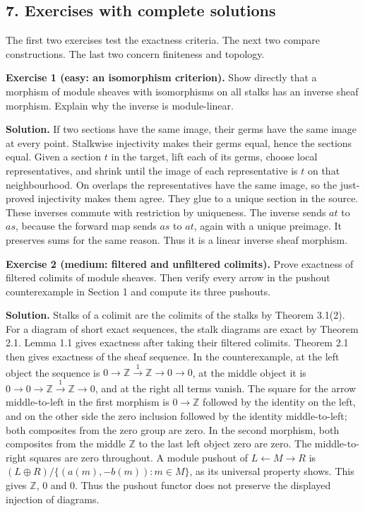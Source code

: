 \documentclass[
  english,
  11pt,
  a4paper,
]{article}
\begin{document}
\subsection{7. Exercises with complete
solutions}\label{sheaves-of-modules-on-a-ringed-space--7-exercises-with-complete-solutions}

The first two exercises test the exactness criteria. The next two
compare constructions. The last two concern finiteness and topology.

\textbf{Exercise 1 (easy: an isomorphism criterion).} Show directly that
a morphism of module sheaves with isomorphisms on all stalks has an
inverse sheaf morphism. Explain why the inverse is module-linear.

\textbf{Solution.} If two sections have the same image, their germs have
the same image at every point. Stalkwise injectivity makes their germs
equal, hence the sections equal. Given a section \(t\) in the target,
lift each of its germs, choose local representatives, and shrink until
the image of each representative is \(t\) on that neighbourhood. On
overlaps the representatives have the same image, so the just-proved
injectivity makes them agree. They glue to a unique section in the
source. These inverses commute with restriction by uniqueness. The
inverse sends \(a t\) to \(a s\), because the forward map sends \(a s\)
to \(a t\), again with a unique preimage. It preserves sums for the same
reason. Thus it is a linear inverse sheaf morphism.

\textbf{Exercise 2 (medium: filtered and unfiltered colimits).} Prove
exactness of filtered colimits of module sheaves. Then verify every
arrow in the pushout counterexample in Section 1 and compute its three
pushouts.

\textbf{Solution.} Stalks of a colimit are the colimits of the stalks by
Theorem 3.1(2). For a diagram of short exact sequences, the stalk
diagrams are exact by Theorem 2.1. Lemma 1.1 gives exactness after
taking their filtered colimits. Theorem 2.1 then gives exactness of the
sheaf sequence. In the counterexample, at the left object the sequence
is \(0\to\mathbb Z\xrightarrow{1}\mathbb Z\to0\to0\), at the middle
object it is \(0\to0\to\mathbb Z\xrightarrow{1}\mathbb Z\to0\), and at
the right all terms vanish. The square for the arrow middle-to-left in
the first morphism is \(0\to\mathbb Z\) followed by the identity on the
left, and on the other side the zero inclusion followed by the identity
middle-to-left; both composites from the zero group are zero. In the
second morphism, both composites from the middle \(\mathbb Z\) to the
last left object zero are zero. The middle-to-right squares are zero
throughout. A module pushout of \(L\leftarrow M\to R\) is
\((L\oplus R)/\{(a(m),-b(m)):m\in M\}\), as its universal property
shows. This gives \(\mathbb Z\), \(0\) and \(0\). Thus the pushout
functor does not preserve the displayed injection of diagrams.
\end{document}
